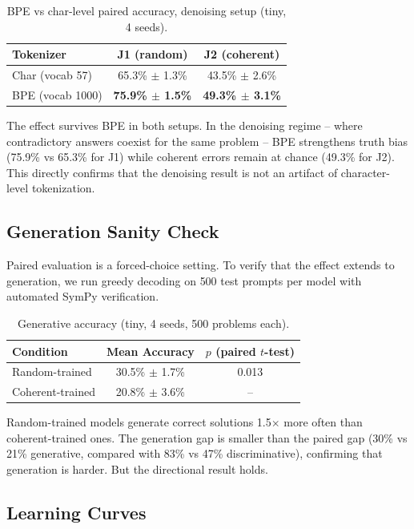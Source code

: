\documentclass[10pt]{article} %
\begin{document}
\begin{table}[t]
\caption{BPE vs char-level paired accuracy, denoising setup (tiny, 4 seeds).}
\label{tab:bpe_denoise}
\centering
\begin{tabular}{lcc}
\toprule
Tokenizer & J1 (random) & J2 (coherent) \\
\midrule
Char (vocab 57) & 65.3\% $\pm$ 1.3\% & 43.5\% $\pm$ 2.6\% \\
BPE (vocab 1000) & \textbf{75.9\% $\pm$ 1.5\%} & \textbf{49.3\% $\pm$ 3.1\%} \\
\bottomrule
\end{tabular}
\end{table}

The effect survives BPE in both setups. In the denoising regime -- where contradictory answers coexist for the same problem -- BPE strengthens truth bias (75.9\% vs 65.3\% for J1) while coherent errors remain at chance (49.3\% for J2). This directly confirms that the denoising result is not an artifact of character-level tokenization.

\subsection{Generation Sanity Check}

Paired evaluation is a forced-choice setting. To verify that the effect extends to generation, we run greedy decoding on 500 test prompts per model with automated SymPy verification.

\begin{table}[t]
\caption{Generative accuracy (tiny, 4 seeds, 500 problems each).}
\label{tab:generation}
\centering
\begin{tabular}{lcc}
\toprule
Condition & Mean Accuracy & $p$ (paired $t$-test) \\
\midrule
Random-trained & 30.5\% $\pm$ 1.7\% & 0.013 \\
Coherent-trained & 20.8\% $\pm$ 3.6\% & -- \\
\bottomrule
\end{tabular}
\end{table}

Random-trained models generate correct solutions 1.5$\times$ more often than coherent-trained ones. The generation gap is smaller than the paired gap (30\% vs 21\% generative, compared with 83\% vs 47\% discriminative), confirming that generation is harder. But the directional result holds.

\subsection{Learning Curves}
\end{document}
